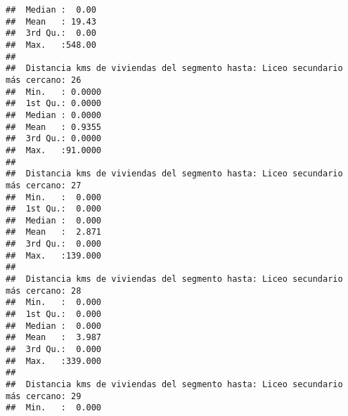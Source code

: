 \documentclass[11pt,]{article}
\begin{document}
\begin{verbatim}
##  Median :  0.00                                                                 
##  Mean   : 19.43                                                                 
##  3rd Qu.:  0.00                                                                 
##  Max.   :548.00                                                                 
##                                                                                 
##  Distancia kms de viviendas del segmento hasta: Liceo secundario más cercano: 26
##  Min.   : 0.0000                                                                
##  1st Qu.: 0.0000                                                                
##  Median : 0.0000                                                                
##  Mean   : 0.9355                                                                
##  3rd Qu.: 0.0000                                                                
##  Max.   :91.0000                                                                
##                                                                                 
##  Distancia kms de viviendas del segmento hasta: Liceo secundario más cercano: 27
##  Min.   :  0.000                                                                
##  1st Qu.:  0.000                                                                
##  Median :  0.000                                                                
##  Mean   :  2.871                                                                
##  3rd Qu.:  0.000                                                                
##  Max.   :139.000                                                                
##                                                                                 
##  Distancia kms de viviendas del segmento hasta: Liceo secundario más cercano: 28
##  Min.   :  0.000                                                                
##  1st Qu.:  0.000                                                                
##  Median :  0.000                                                                
##  Mean   :  3.987                                                                
##  3rd Qu.:  0.000                                                                
##  Max.   :339.000                                                                
##                                                                                 
##  Distancia kms de viviendas del segmento hasta: Liceo secundario más cercano: 29
##  Min.   :  0.000                                                                

\end{verbatim}
\end{document}
